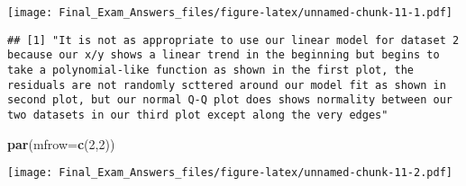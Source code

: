 \documentclass[
]{article}
\newenvironment{Shaded}{\begin{snugshade}}{\end{snugshade}}
\newcommand{\DataTypeTok}[1]{\textcolor[rgb]{0.13,0.29,0.53}{#1}}
\newcommand{\DecValTok}[1]{\textcolor[rgb]{0.00,0.00,0.81}{#1}}
\newcommand{\KeywordTok}[1]{\textcolor[rgb]{0.13,0.29,0.53}{\textbf{#1}}}
\newcommand{\NormalTok}[1]{#1}
\newcommand{\OperatorTok}[1]{\textcolor[rgb]{0.81,0.36,0.00}{\textbf{#1}}}
\newcommand{\StringTok}[1]{\textcolor[rgb]{0.31,0.60,0.02}{#1}}
\begin{document}
\texttt{[image: Final\_Exam\_Answers\_files/figure-latex/unnamed-chunk-11-1.pdf]}

\begin{Shaded}
\end{Shaded}

\begin{verbatim}
## [1] "It is not as appropriate to use our linear model for dataset 2 because our x/y shows a linear trend in the beginning but begins to take a polynomial-like function as shown in the first plot, the residuals are not randomly scttered around our model fit as shown in second plot, but our normal Q-Q plot does shows normality between our two datasets in our third plot except along the very edges"
\end{verbatim}

\begin{Shaded}
\begin{Highlighting}[]
\KeywordTok{par}\NormalTok{(}\DataTypeTok{mfrow=}\KeywordTok{c}\NormalTok{(}\DecValTok{2}\NormalTok{,}\DecValTok{2}\NormalTok{))}
\end{Highlighting}
\end{Shaded}

\texttt{[image: Final\_Exam\_Answers\_files/figure-latex/unnamed-chunk-11-2.pdf]}
\end{document}
